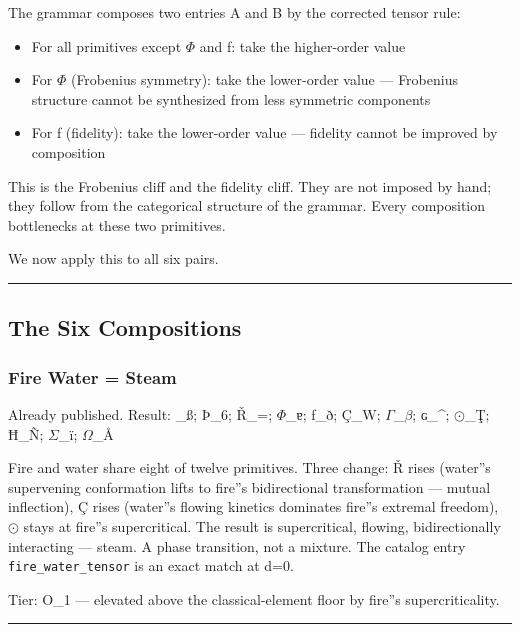 \documentclass[12pt,a4paper]{article}
\begin{document}
The grammar composes two entries A and B by the corrected tensor rule:

\begin{itemize}
    \item For all primitives except $\Phi$ and ƒ: take the higher-order value
    \item For $\Phi$ (Frobenius symmetry): take the lower-order value --- Frobenius structure cannot be synthesized from less symmetric components
    \item For ƒ (fidelity): take the lower-order value --- fidelity cannot be improved by composition
\end{itemize}

This is the Frobenius cliff and the fidelity cliff. They are not imposed by hand; they follow from the categorical structure of the grammar. Every composition bottlenecks at these two primitives.

We now apply this to all six pairs.

\begin{center}
\rule{0.5\textwidth}{0.4pt}
\end{center}

\subsection{The Six Compositions}

\subsubsection{Fire \otimes Water = Steam}

Already published. Result: \_ß; Þ\_6; Ř\_=; $\Phi$\_ɐ; ƒ\_ð; Ç\_W; $\Gamma$\_$\beta$; ɢ\_\^{}; $\odot$\_Ţ; Ħ\_Ñ; $\Sigma$\_ï; $\Omega$\_Å\rangle

Fire and water share eight of twelve primitives. Three change: Ř rises (water''s supervening conformation lifts to fire''s bidirectional transformation --- mutual inflection), Ç rises (water''s flowing kinetics dominates fire''s extremal freedom), $\odot$ stays at fire''s supercritical. The result is supercritical, flowing, bidirectionally interacting --- steam. A phase transition, not a mixture. The catalog entry \texttt{fire\_water\_tensor} is an exact match at d=0.

Tier: O\_1 --- elevated above the classical-element floor by fire''s supercriticality.

\begin{center}
\rule{0.5\textwidth}{0.4pt}
\end{center}
\end{document}
